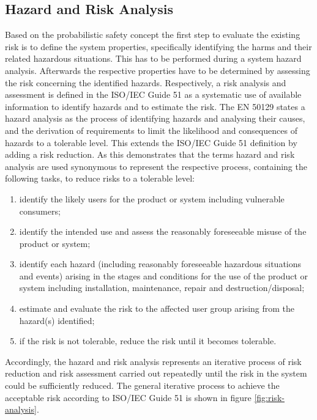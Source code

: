 \documentclass{template/openetcs_report}
\begin{document}
\subsection{Hazard and Risk Analysis}
\label{sec:HandR-Ana}

Based on the probabilistic safety concept the first step to evaluate the existing risk is to define the system properties, specifically identifying the harms and their related hazardous situations. This has to be performed during a system hazard analysis. Afterwards the respective properties have to be determined by assessing the risk concerning the identified hazards. Respectively, a risk analysis and assessment is defined in the ISO/IEC Guide 51 as a systematic use of available information to identify hazards and to estimate the risk. The EN 50129 states a hazard analysis as the process of identifying hazards and analysing their causes, and the derivation of requirements to limit the likelihood and consequences of hazards to a tolerable level. This extends the ISO/IEC Guide 51 definition by adding a risk reduction. As this demonstrates that the terms hazard and risk analysis are used synonymous to represent the respective process, containing the following tasks, to reduce risks to a tolerable level:

\begin{enumerate}
\item identify the likely users for the product or system including vulnerable consumers; 
\item identify the intended use and assess the reasonably foreseeable misuse of the product or system; 
\item identify each hazard (including reasonably foreseeable hazardous situations and events) arising in the stages and conditions for the use of the product or system including installation, maintenance, repair and destruction/disposal; 
\item estimate and evaluate the risk to the affected user group arising from the hazard(s) identified;
\item if the risk is not tolerable, reduce the risk until it becomes tolerable.
\end{enumerate}

Accordingly, the hazard and risk analysis represents an iterative process of risk reduction and risk assessment carried out repeatedly until the risk in the system could be sufficiently reduced. The general iterative process to achieve the acceptable risk according to ISO/IEC Guide 51 is shown in figure \ref{fig:risk-analysis}.
\end{document}
